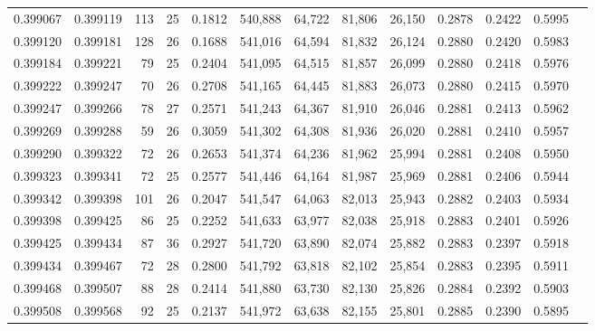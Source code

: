 \begin{tabular}{rrrrrrrrrrrrr}
0.399067 & 0.399119 &   113 &  25 &                                     0.1812 & 540,888 &  64,722 &  81,806 &  26,150 & 0.2878 & 0.2422 & 0.5995 \\
0.399120 & 0.399181 &   128 &  26 &                                     0.1688 & 541,016 &  64,594 &  81,832 &  26,124 & 0.2880 & 0.2420 & 0.5983 \\
0.399184 & 0.399221 &    79 &  25 &                                     0.2404 & 541,095 &  64,515 &  81,857 &  26,099 & 0.2880 & 0.2418 & 0.5976 \\
0.399222 & 0.399247 &    70 &  26 &                                     0.2708 & 541,165 &  64,445 &  81,883 &  26,073 & 0.2880 & 0.2415 & 0.5970 \\
0.399247 & 0.399266 &    78 &  27 &                                     0.2571 & 541,243 &  64,367 &  81,910 &  26,046 & 0.2881 & 0.2413 & 0.5962 \\
0.399269 & 0.399288 &    59 &  26 &                                     0.3059 & 541,302 &  64,308 &  81,936 &  26,020 & 0.2881 & 0.2410 & 0.5957 \\
0.399290 & 0.399322 &    72 &  26 &                                     0.2653 & 541,374 &  64,236 &  81,962 &  25,994 & 0.2881 & 0.2408 & 0.5950 \\
0.399323 & 0.399341 &    72 &  25 &                                     0.2577 & 541,446 &  64,164 &  81,987 &  25,969 & 0.2881 & 0.2406 & 0.5944 \\
0.399342 & 0.399398 &   101 &  26 &                                     0.2047 & 541,547 &  64,063 &  82,013 &  25,943 & 0.2882 & 0.2403 & 0.5934 \\
0.399398 & 0.399425 &    86 &  25 &                                     0.2252 & 541,633 &  63,977 &  82,038 &  25,918 & 0.2883 & 0.2401 & 0.5926 \\
0.399425 & 0.399434 &    87 &  36 &                                     0.2927 & 541,720 &  63,890 &  82,074 &  25,882 & 0.2883 & 0.2397 & 0.5918 \\
0.399434 & 0.399467 &    72 &  28 &                                     0.2800 & 541,792 &  63,818 &  82,102 &  25,854 & 0.2883 & 0.2395 & 0.5911 \\
0.399468 & 0.399507 &    88 &  28 &                                     0.2414 & 541,880 &  63,730 &  82,130 &  25,826 & 0.2884 & 0.2392 & 0.5903 \\
0.399508 & 0.399568 &    92 &  25 &                                     0.2137 & 541,972 &  63,638 &  82,155 &  25,801 & 0.2885 & 0.2390 & 0.5895 \\

\end{tabular}

